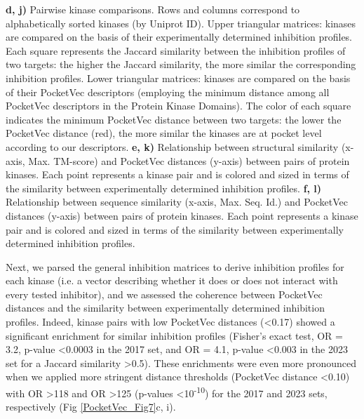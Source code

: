 \begin{figurehere}
\begin{center}
{    \textbf{d, j)} Pairwise kinase comparisons. Rows and columns correspond to alphabetically sorted kinases (by Uniprot ID). Upper triangular matrices: kinases are compared on the basis of their experimentally determined inhibition profiles. Each square represents the Jaccard similarity between the inhibition profiles of two targets: the higher the Jaccard similarity, the more similar the corresponding inhibition profiles. Lower triangular matrices: kinases are compared on the basis of their PocketVec descriptors (employing the minimum distance among all PocketVec descriptors in the Protein Kinase Domains). The color of each square indicates the minimum PocketVec distance between two targets: the lower the PocketVec distance (red), the more similar the kinases are at pocket level according to our descriptors.
    \textbf{e, k)} Relationship between structural similarity (x-axis, Max. TM-score) and PocketVec distances (y-axis) between pairs of protein kinases. Each point represents a kinase pair and is colored and sized in terms of the similarity between experimentally determined inhibition profiles.
    \textbf{f, l)} Relationship between sequence similarity (x-axis, Max. Seq. Id.) and PocketVec distances (y-axis) between pairs of protein kinases. Each point represents a kinase pair and is colored and sized in terms of the similarity between experimentally determined inhibition profiles.
 }
 \label{PocketVec_Fig7}
 \end{center}
\end{figurehere}
  

Next, we parsed the general inhibition matrices to derive inhibition profiles for each kinase (i.e. a vector describing whether it does or does not interact with every tested inhibitor), and we assessed the coherence between PocketVec distances and the similarity between experimentally determined inhibition profiles. Indeed, kinase pairs with low PocketVec distances (<0.17) showed a significant enrichment for similar inhibition profiles (Fisher’s exact test, OR = 3.2, p-value <0.0003 in the 2017 set, and OR = 4.1, p-value <0.003 in the 2023 set for a Jaccard similarity >0.5). These enrichments were even more pronounced when we applied more stringent distance thresholds (PocketVec distance <0.10) with OR >118 and OR >125 (p-values <10\textsuperscript{-10}) for the 2017 and 2023 sets, respectively (Fig \ref{PocketVec_Fig7}c, i).

